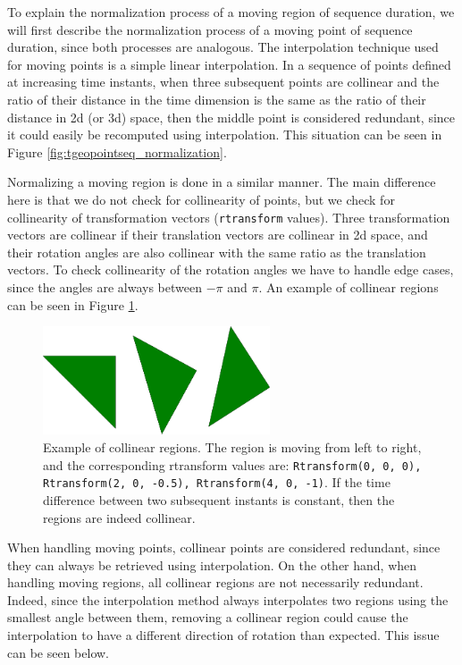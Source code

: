 To explain the normalization process of a moving region of sequence duration, we will first describe the normalization process of a moving point of sequence duration, since both processes are analogous. The interpolation technique used for moving points is a simple linear interpolation. In a sequence of points defined at increasing time instants, when three subsequent points are collinear and the ratio of their distance in the time dimension is the same as the ratio of their distance in 2d (or 3d) space, then the middle point is considered redundant, since it could easily be recomputed using interpolation. This situation can be seen in Figure \ref{fig:tgeopointseq_normalization}.

Normalizing a moving region is done in a similar manner. The main difference here is that we do not check for collinearity of points, but we check for collinearity of transformation vectors (\lstinline+rtransform+ values). Three transformation vectors are collinear if their translation vectors are collinear in 2d space, and their rotation angles are also collinear with the same ratio as the translation vectors. To check collinearity of the rotation angles we have to handle edge cases, since the angles are always between $-\pi$ and $\pi$. An example of collinear regions can be seen in Figure \ref{fig:collinear_regions}.

\begin{figure}[h!]
    \centering
    \includegraphics[width=0.6\textwidth]{images/collinear_regions.pdf}
    \caption[Example of collinear regions]{Example of collinear regions. The region is moving from left to right, and the corresponding rtransform values are: \lstinline{Rtransform(0, 0, 0), Rtransform(2, 0, -0.5), Rtransform(4, 0, -1)}. If the time difference between two subsequent instants is constant, then the regions are indeed collinear.}
    \label{fig:collinear_regions}
\end{figure}

When handling moving points, collinear points are considered redundant, since they can always be retrieved using interpolation. On the other hand, when handling moving regions, all collinear regions are not necessarily redundant. Indeed, since the interpolation method always interpolates two regions using the smallest angle between them, removing a collinear region could cause the interpolation to have a different direction of rotation than expected. This issue can be seen below.

